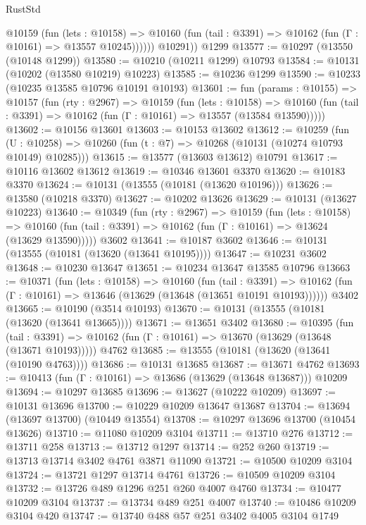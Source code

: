 \begin{lexlean}{RustStd}
\begin{coremodule}
            @10159
              (fun (lets : @10158) =>
              @10160 (fun (tail : @3391) => @10162 (fun (Γ : @10161) => @13557 @10245))))))
        @10291))
    @1299
@13577 := @10297 (@13550 (@10148 @1299))
@13580 := @10210 (@10211 @1299) @10793
@13584 := @10131 (@10202 (@13580 @10219) @10223)
@13585 := @10236 @1299
@13590 := @10233 (@10235 @13585 @10796 @10191 @10193)
@13601 := fun (params : @10155) =>
  @10157
    (fun (rty : @2967) =>
    @10159
      (fun (lets : @10158) =>
      @10160 (fun (tail : @3391) => @10162 (fun (Γ : @10161) => @13557 (@13584 @13590)))))
@13602 := @10156 @13601
@13603 := @10153 @13602
@13612 := @10259
    (fun (U : @10258) => @10260 (fun (t : @7) => @10268 (@10131 (@10274 @10793 @10149) @10285)))
@13615 := @13577 (@13603 @13612) @10791
@13617 := @10116 @13602 @13612
@13619 := @10346 @13601 @3370
@13620 := @10183 @3370
@13624 := @10131 (@13555 (@10181 (@13620 @10196)))
@13626 := @13580 (@10218 @3370)
@13627 := @10202 @13626
@13629 := @10131 (@13627 @10223)
@13640 := @10349
    (fun (rty : @2967) =>
    @10159
      (fun (lets : @10158) =>
      @10160 (fun (tail : @3391) => @10162 (fun (Γ : @10161) => @13624 (@13629 @13590)))))
    @3602
@13641 := @10187 @3602
@13646 := @10131 (@13555 (@10181 (@13620 (@13641 @10195))))
@13647 := @10231 @3602
@13648 := @10230 @13647
@13651 := @10234 @13647 @13585 @10796
@13663 := @10371
    (fun (lets : @10158) =>
    @10160
      (fun (tail : @3391) =>
      @10162 (fun (Γ : @10161) => @13646 (@13629 (@13648 (@13651 @10191 @10193))))))
    @3402
@13665 := @10190 (@3514 @10193)
@13670 := @10131 (@13555 (@10181 (@13620 (@13641 @13665))))
@13671 := @13651 @3402
@13680 := @10395
    (fun (tail : @3391) => @10162 (fun (Γ : @10161) => @13670 (@13629 (@13648 (@13671 @10193)))))
    @4762
@13685 := @13555 (@10181 (@13620 (@13641 (@10190 @4763))))
@13686 := @10131 @13685
@13687 := @13671 @4762
@13693 := @10413 (fun (Γ : @10161) => @13686 (@13629 (@13648 @13687))) @10209
@13694 := @10297 @13685
@13696 := @13627 (@10222 @10209)
@13697 := @10131 @13696
@13700 := @10229 @10209 @13647 @13687
@13704 := @13694 (@13697 @13700) (@10449 @13554)
@13708 := @10297 @13696 @13700 (@10454 @13626)
@13710 := @11080 @10209 @3104
@13711 := @13710 @276
@13712 := @13711 @258
@13713 := @13712 @1297
@13714 := @252 @260
@13719 := @13713 @13714 @3402 @4761 @3871 @11090
@13721 := @10500 @10209 @3104
@13724 := @13721 @1297 @13714 @4761
@13726 := @10509 @10209 @3104
@13732 := @13726 @489 @1296 @251 @260 @4007 @4760
@13734 := @10477 @10209 @3104
@13737 := @13734 @489 @251 @4007
@13740 := @10486 @10209 @3104 @420
@13747 := @13740 @488 @57 @251 @3402 @4005 @3104 @1749

\end{coremodule}
\end{lexlean}
